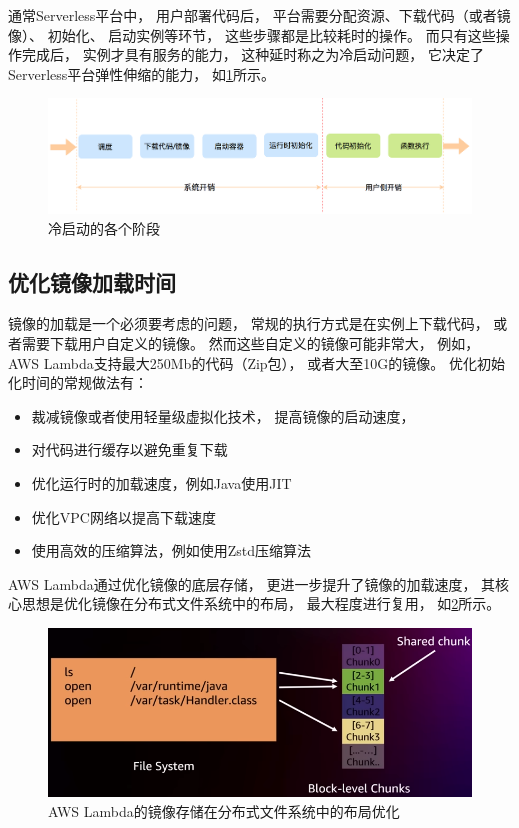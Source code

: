 通常Serverless平台中，
用户部署代码后，
平台需要分配资源、下载代码（或者镜像）、
初始化、
启动实例等环节，
这些步骤都是比较耗时的操作。
而只有这些操作完成后，
实例才具有服务的能力，
这种延时称之为冷启动问题，
它决定了Serverless平台弹性伸缩的能力，
如\cref{cold_start}所示。

\begin{figure}[ht!]
    \centering
    \includegraphics[width=\linewidth]{images/cold_start.png}
    \caption{冷启动的各个阶段\cite{meituan_serverless_nest}}
    \label{cold_start}
\end{figure}

\subsection{优化镜像加载时间}
镜像的加载是一个必须要考虑的问题，
常规的执行方式是在实例上下载代码，
或者需要下载用户自定义的镜像。
然而这些自定义的镜像可能非常大，
例如，
AWS Lambda支持最大250Mb的代码（Zip包），
或者大至10G的镜像。
优化初始化时间的常规做法有：

\begin{itemize}
    \item 裁减镜像或者使用轻量级虚拟化技术，
    提高镜像的启动速度\cite{meituan_serverless_nest, tecent_faas_cold_start}，
    \item 对代码进行缓存以避免重复下载\cite{tecent_faas_cold_start}
    \item 优化运行时的加载速度，例如Java使用JIT\cite{carreira2021warm}
    \item 优化VPC网络以提高下载速度\cite{tecent_vpc_cold_start}
    \item 使用高效的压缩算法，例如使用Zstd压缩算法\cite{meituan_serverless_nest}
\end{itemize}

AWS Lambda通过优化镜像的底层存储，
更进一步提升了镜像的加载速度，
其核心思想是优化镜像在分布式文件系统中的布局，
最大程度进行复用，
如\cref{lambda_container_layer_chunk}所示。

\begin{figure}[ht!]
    \centering
    \includegraphics[width=\linewidth]{images/lambda_container_layer_chunk.png}
    \caption{AWS Lambda的镜像存储在分布式文件系统中的布局优化\cite{aws_lambda_2022}}
    \label{lambda_container_layer_chunk}
\end{figure}

